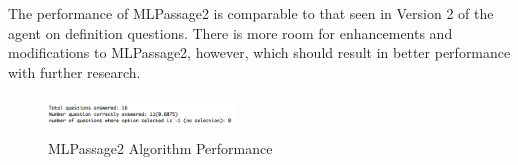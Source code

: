 The performance of MLPassage2 is comparable to that seen in Version 2 of the agent on definition questions.  There is more room for enhancements and modifications to MLPassage2, however, which should result in better performance with further research.

\begin{figure}
\centering
\vspace{1.0in}
\includegraphics[width=50mm, height=10mm]{mlpassage2_performance.png}
\caption{MLPassage2 Algorithm Performance}
\label{fig:mlpassage2_performance}
\end{figure}





















